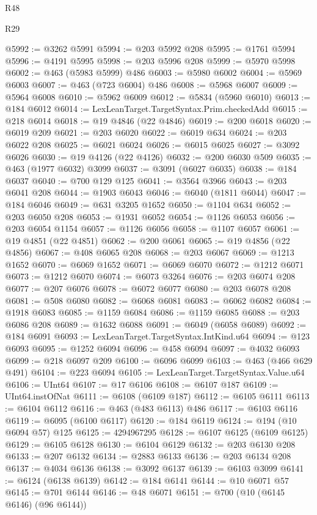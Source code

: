 \begin{lexlean}{R48}
\begin{lexlean}{R29}
\begin{coremodule}
{{{{{{{{{{{{{{{{{{{{{{{{{{{{{{{{{{{{{{{{{{{{{{{{{{{{{{{{{{{{{{{{{{{{{{{{{{{{{{{{{{{{{{{{{{{{{{{{{{{{{{{{{{{{{{{{{{{{{{{{{{{{{{{{{{{{{{{{{{{{{{{{{{{{{{{{{{{{{{{{{{{{{{{{{{{{{{{{{{{{{{{{{{{{{{{{{{{{{{{{{{{{{{{{{{{{{{{{{{@5992 := @3262 @5991
@5994 := @203 @5992 @208
@5995 := @1761 @5994
@5996 := @4191 @5995
@5998 := @203 @5996 @208
@5999 := @5970 @5998
@6002 := @463 (@5983 @5999) @486
@6003 := @5980 @6002
@6004 := @5969 @6003
@6007 := @463 (@723 @6004) @486
@6008 := @5968 @6007
@6009 := @5964 @6008
@6010 := @5962 @6009
@6012 := @5834 (@5960 @6010)
@6013 := @184 @6012
@6014 := LexLeanTarget.TargetSyntax.Prim.checkedAdd
@6015 := @218 @6014
@6018 := @19 @4846 (@22 @4846)
@6019 := @200 @6018
@6020 := @6019 @209
@6021 := @203 @6020
@6022 := @6019 @634
@6024 := @203 @6022 @208
@6025 := @6021 @6024
@6026 := @6015 @6025
@6027 := @3092 @6026
@6030 := @19 @4126 (@22 @4126)
@6032 := @200 @6030 @509
@6035 := @463 (@1977 @6032) @3099
@6037 := @3091 (@6027 @6035)
@6038 := @184 @6037
@6040 := @700 @129 @125
@6041 := @3564 @3966
@6043 := @203 @6041 @208
@6044 := @1903 @6043
@6046 := @6040 (@1811 @6044)
@6047 := @184 @6046
@6049 := @631 @3205 @1652
@6050 := @1104 @634
@6052 := @203 @6050 @208
@6053 := @1931 @6052
@6054 := @1126 @6053
@6056 := @203 @6054 @1154
@6057 := @1126 @6056
@6058 := @1107 @6057
@6061 := @19 @4851 (@22 @4851)
@6062 := @200 @6061
@6065 := @19 @4856 (@22 @4856)
@6067 := @408 @6065 @208
@6068 := @203 @6067
@6069 := @1213 @1652
@6070 := @6069 @1652
@6071 := @6069 @6070
@6072 := @1212 @6071
@6073 := @1212 @6070
@6074 := @6073 @3264
@6076 := @203 @6074 @208
@6077 := @207 @6076
@6078 := @6072 @6077
@6080 := @203 @6078 @208
@6081 := @508 @6080
@6082 := @6068 @6081
@6083 := @6062 @6082
@6084 := @1918 @6083
@6085 := @1159 @6084
@6086 := @1159 @6085
@6088 := @203 @6086 @208
@6089 := @1632 @6088
@6091 := @6049 (@6058 @6089)
@6092 := @184 @6091
@6093 := LexLeanTarget.TargetSyntax.IntKind.u64
@6094 := @123 @6093
@6095 := @1252 @6094
@6096 := @458 @6094
@6097 := @4032 @6093
@6099 := @218 @6097 @209
@6100 := @6096 @6099
@6103 := @463 (@466 @629 @491)
@6104 := @223 @6094
@6105 := LexLeanTarget.TargetSyntax.Value.u64
@6106 := UInt64
@6107 := @17 @6106
@6108 := @6107 @187
@6109 := UInt64.instOfNat
@6111 := @6108 (@6109 @187)
@6112 := @6105 @6111
@6113 := @6104 @6112
@6116 := @463 (@483 @6113) @486
@6117 := @6103 @6116
@6119 := @6095 (@6100 @6117)
@6120 := @184 @6119
@6124 := @194 (@10 @6094 @57) @125
@6125 := 4294967295
@6128 := @6107 @6125 (@6109 @6125)
@6129 := @6105 @6128
@6130 := @6104 @6129
@6132 := @203 @6130 @208
@6133 := @207 @6132
@6134 := @2883 @6133
@6136 := @203 @6134 @208
@6137 := @4034 @6136
@6138 := @3092 @6137
@6139 := @6103 @3099
@6141 := @6124 (@6138 @6139)
@6142 := @184 @6141
@6144 := @10 @6071 @57
@6145 := @701 @6144
@6146 := @48 @6071
@6151 := @700 (@10 (@6145 @6146) (@96 @6144))
}}}}}}}}}}}}}}}}}}}}}}}}}}}}}}}}}}}}}}}}}}}}}}}}}}}}}}}}}}}}}}}}}}}}}}}}}}}}}}}}}}}}}}}}}}}}}}}}}}}}}}}}}}}}}}}}}}}}}}}}}}}}}}}}}}}}}}}}}}}}}}}}}}}}}}}}}}}}}}}}}}}}}}}}}}}}}}}}}}}}}}}}}}}}}}}}}}}}}}}}}}}}}}}}}}}}}}}}}}
\end{coremodule}
\end{lexlean}
\end{lexlean}
